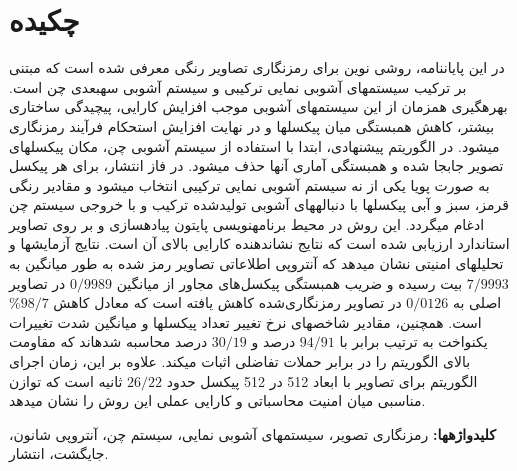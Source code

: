 

\chapter*{چکیده}

در این پایاننامه، روشی نوین برای رمزنگاری تصاویر رنگی معرفی شده است که مبتنی بر ترکیب سیستمهای آشوبی نمایی ترکیبی و سیستم آشوبی سهبعدی چن است. بهرهگیری همزمان از این سیستمهای آشوبی موجب افزایش کارایی، پیچیدگی ساختاری بیشتر، کاهش همبستگی میان پیکسلها و در نهایت افزایش استحکام فرآیند رمزنگاری میشود. در الگوریتم پیشنهادی، ابتدا با استفاده از سیستم آشوبی چن، مکان پیکسلهای تصویر جابجا شده و همبستگی آماری آنها حذف میشود. در فاز انتشار، برای هر پیکسل به صورت پویا یکی از نه سیستم آشوبی نمایی ترکیبی انتخاب میشود و مقادیر رنگی قرمز، سبز و آبی پیکسلها با دنبالههای آشوبی تولیدشده ترکیب و با خروجی سیستم چن ادغام میگردد. این روش در محیط برنامهنویسی پایتون پیادهسازی و بر روی تصاویر استاندارد ارزیابی شده است که نتایج نشاندهنده کارایی بالای آن است. نتایج آزمایشها و تحلیلهای امنیتی نشان میدهد که آنتروپی اطلاعاتی تصاویر رمز شده به طور میانگین به $7/9993$ بیت رسیده و ضریب همبستگی پیکسل‌های مجاور از میانگین $0/9989$ در تصاویر اصلی به $0/0126$ در تصاویر رمزنگاری‌شده کاهش یافته است که معادل کاهش $98/7$\% است. همچنین، مقادیر شاخصهای نرخ تغییر تعداد پیکسلها و میانگین شدت تغییرات یکنواخت به ترتیب برابر با $94/91$ درصد و $30/19$ درصد محاسبه شدهاند که مقاومت بالای الگوریتم را در برابر حملات تفاضلی اثبات میکند. علاوه بر این، زمان اجرای الگوریتم برای تصاویر با ابعاد 512 در 512 پیکسل حدود $26/22$ ثانیه است که توازن مناسبی میان امنیت محاسباتی و کارایی عملی این روش را نشان میدهد.
    
    \vspace{1cm}
    \textbf{کلیدواژهها:} رمزنگاری تصویر، سیستمهای آشوبی نمایی، سیستم چن، آنتروپی شانون، جایگشت، انتشار.
    \newpage


